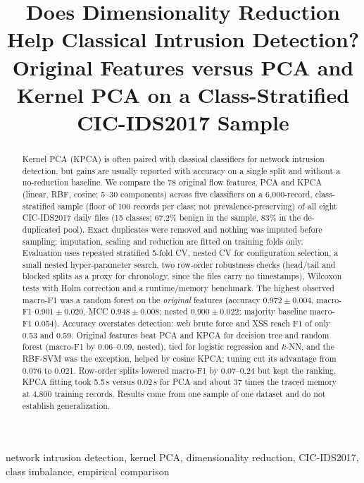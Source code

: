 \documentclass[conference]{IEEEtran}
\begin{document}
\title{Does Dimensionality Reduction Help Classical Intrusion Detection? Original Features versus PCA and Kernel PCA on a Class-Stratified CIC-IDS2017 Sample}

\author{}

\maketitle

\begin{abstract}
Kernel PCA (KPCA) is often paired with classical classifiers for network intrusion detection, but gains are usually reported with accuracy on a single split and without a no-reduction baseline. We compare the 78 original flow features, PCA and KPCA (linear, RBF, cosine; 5--30 components) across five classifiers on a 6{,}000-record, class-stratified sample (floor of 100 records per class; not prevalence-preserving) of all eight CIC-IDS2017 daily files (15 classes; 67.2\% benign in the sample, 83\% in the de-duplicated pool). Exact duplicates were removed and nothing was imputed before sampling; imputation, scaling and reduction are fitted on training folds only. Evaluation uses repeated stratified 5-fold CV, nested CV for configuration selection, a small nested hyper-parameter search, two row-order robustness checks (head/tail and blocked splits as a proxy for chronology, since the files carry no timestamps), Wilcoxon tests with Holm correction and a runtime/memory benchmark. The highest observed macro-F1 was a random forest on the \emph{original} features (accuracy $0.972\pm0.004$, macro-F1 $0.901\pm0.020$, MCC $0.948\pm0.008$; nested $0.900\pm0.022$; majority baseline macro-F1 0.054). Accuracy overstates detection: web brute force and XSS reach F1 of only 0.53 and 0.59. Original features beat PCA and KPCA for decision tree and random forest (macro-F1 by 0.06--0.09, nested), tied for logistic regression and $k$-NN, and the RBF-SVM was the exception, helped by cosine KPCA; tuning cut its advantage from 0.076 to 0.021. Row-order splits lowered macro-F1 by 0.07--0.24 but kept the ranking. KPCA fitting took 5.5\,s versus 0.02\,s for PCA and about 37 times the traced memory at 4{,}800 training records. Results come from one sample of one dataset and do not establish generalization.
\end{abstract}

\begin{IEEEkeywords}
network intrusion detection, kernel PCA, dimensionality reduction, CIC-IDS2017, class imbalance, empirical comparison
\end{IEEEkeywords}
\end{document}
